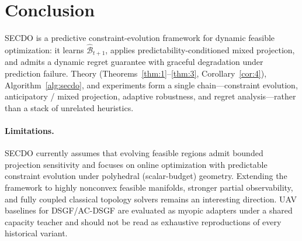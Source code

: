 \section{Conclusion}
\label{sec:concl}

SECDO is a predictive constraint-evolution framework for dynamic feasible optimization:
it learns $\hat{\mathcal{B}}_{t+1}$, applies predictability-conditioned mixed projection, and admits a dynamic regret guarantee with graceful degradation under prediction failure.
Theory (Theorems~\ref{thm:1}--\ref{thm:3}, Corollary~\ref{cor:4}), Algorithm~\ref{alg:secdo}, and experiments form a single chain---constraint evolution, anticipatory / mixed projection, adaptive robustness, and regret analysis---rather than a stack of unrelated heuristics.

\paragraph{Limitations.}
SECDO currently assumes that evolving feasible regions admit bounded projection sensitivity and focuses on online optimization with predictable constraint evolution under polyhedral (scalar-budget) geometry.
Extending the framework to highly nonconvex feasible manifolds, stronger partial observability, and fully coupled classical topology solvers remains an interesting direction.
UAV baselines for DSGF/AC-DSGF are evaluated as myopic adapters under a shared capacity teacher and should not be read as exhaustive reproductions of every historical variant.
